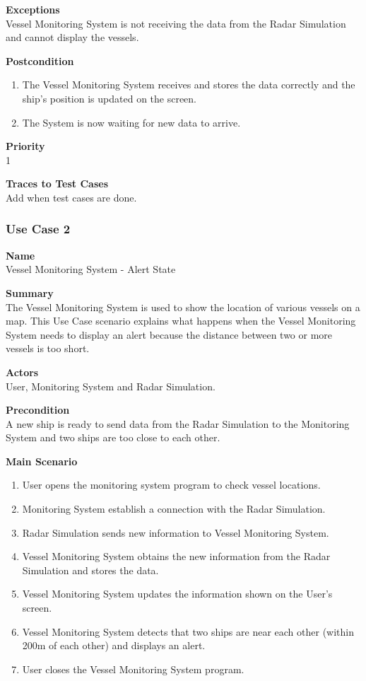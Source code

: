 \noindent
{\bf Exceptions}\\
Vessel Monitoring System is not receiving the data from the Radar Simulation and cannot display the vessels.

\noindent
{\bf Postcondition}\\
\vspace*{-0.2in}
\begin{enumerate}
\item The Vessel Monitoring System receives and stores the data correctly and the ship's position is updated on the screen.
\item The System is now waiting for new data to arrive.
\end{enumerate}

\noindent
{\bf Priority}\\
1

\noindent
{\bf Traces to Test Cases}\\
Add when test cases are done.

\subsubsection{Use Case 2} \label{uc:2}

\noindent
{\bf Name}\\
Vessel Monitoring System - Alert State

\noindent
{\bf Summary}\\
The Vessel Monitoring System is used to show the location of various vessels on a map. This Use Case scenario explains what happens
when the Vessel Monitoring System needs to display an alert because the distance between two or more vessels is too short.

\noindent
{\bf Actors}\\
User, Monitoring System and Radar Simulation.

\noindent
{\bf Precondition}\\
A new ship is ready to send data from the Radar Simulation to the Monitoring System and two ships are too close to each other.

\noindent
{\bf Main Scenario}\\
\vspace*{-0.2in}
\begin{enumerate}
\item User opens the monitoring system program to check vessel locations.
\item Monitoring System establish a connection with the Radar Simulation.
\item Radar Simulation sends new information to Vessel Monitoring System.
\item Vessel Monitoring System obtains the new information from the Radar Simulation and stores the data.
\item Vessel Monitoring System updates the information shown on the User's screen.
\item Vessel Monitoring System detects that two ships are near each other (within 200m of each other) and displays an alert.
\item User closes the Vessel Monitoring System program.
\end{enumerate}

